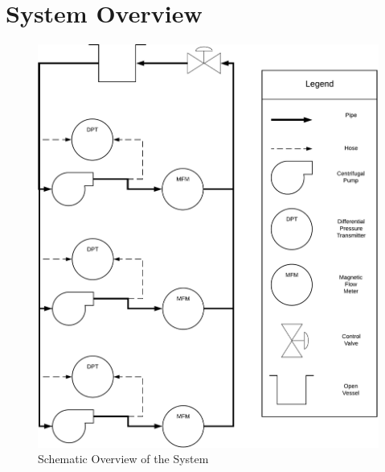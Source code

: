 \chapter{System Overview}
\label{app:overview}
\begin{figure}[H]
    \centering
    \includegraphics[width=\textwidth, height=0.8\textheight, keepaspectratio]{figures/appendix/P4setup.pdf}
    \caption{Schematic Overview of the System}
	\label{fig:overview}
\end{figure}